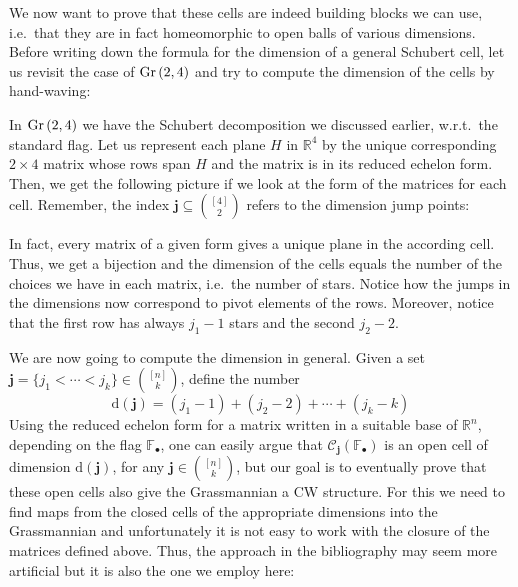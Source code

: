 We now want to prove that these cells are indeed building blocks we can use, i.e.\ that they are in fact homeomorphic to open balls of various dimensions. Before writing down the formula for the dimension of a general Schubert cell, let us revisit the case of $\Gr{2}{4}$ and try to compute the dimension of the cells by hand-waving:

\begin{example} In $\Gr{2}{4}$ we have the Schubert decomposition we discussed earlier, w.r.t.\ the standard flag. Let us represent each plane $H$ in $\mathbb{R}^4$ by the unique corresponding $2\times 4$ matrix whose rows span $H$ and the matrix is in its reduced echelon form. Then, we get the following picture if we look at the form of the matrices for each cell. Remember, the index $\mathbf{j}\subseteq\binom{[4]}{2}$ refers to the dimension jump points:
\begin{center}
\end{center}
In fact, every matrix of a given form gives a unique plane in the according cell. Thus, we get a bijection and the dimension of the cells equals the number of the choices we have in each matrix, i.e.\ the number of stars. Notice how the jumps in the dimensions now correspond to pivot elements of the rows. Moreover, notice that the first row has always $j_1-1$ stars and the second $j_2-2$.
\end{example}

We are now going to compute the dimension in general. Given a set $\mathbf{j}=\{j_1<\cdots<j_k\}\in\binom{[n]}{k}$, define the number
\[\mathrm{d}(\mathbf{j})=(j_1-1)+(j_2-2)+\cdots+(j_k-k)\]
Using the reduced echelon form for a matrix written in a suitable base of $\mathbb{R}^n$, depending on the flag $\mathbb{F}_{\bullet}$, one can easily argue that $\mathcal{C}_{\mathbf{j}}\left(\mathbb{F}_{\bullet}\right)$ is an open cell of dimension $\mathrm{d}(\mathbf{j})$, for any $\mathbf{j}\in\binom{[n]}{k}$, but our goal is to eventually prove that these open cells also give the Grassmannian a CW structure. For this we need to find maps from the closed cells of the appropriate dimensions into the Grassmannian and unfortunately it is not easy to work with the closure of the matrices defined above. Thus, the approach in the bibliography may seem more artificial but it is also the one we employ here:

